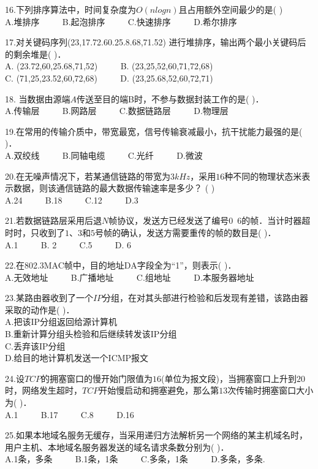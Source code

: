 16.下列排序算法中，时间复杂度为$O(nlogn)$且占用额外空间最少的是(    ) \\
A.堆排序 $\qquad$ B.起泡排序 $\qquad$ C.快速排序 $\qquad$ D.希尔排序

17.对关键码序列(23,17.72.60.25.8.68,71.52) 进行堆排序，输出两个最小关键码后的剩余堆是(    )． \\
A. (23.72,60,25.68,71,52) $\qquad$ B. (23,25,52,60,71,72,68) \\
C. (71,25,23.52,60,72,68) $\qquad$ D. (23,25.68,52,60,72,71)

18. 当数据由源端$A$传送至目的端B时，不参与数据封装工作的是(    )． \\
A.传输层 $\qquad$ B.网路层 $\qquad$ C.数据链路层 $\qquad$ D.物理层

19.在常用的传输介质中，带宽最宽，信号传输衰减最小，抗干扰能力最强的是(    )． \\
A.双绞线 $\qquad$ B.同轴电缆 $\qquad$ C.光纤 $\qquad$ D.微波

20.在无噪声情况下，若某通信链路的带宽为$3kHz$，采用$16$种不同的物理状态米表示数据，则该通信链路的最大数据传输速率是多少？ (    ) \\
A.24 $\qquad$ B.18 $\qquad$ C.12 $\qquad$ D.3

21.若数据链路层采用后退$N$帧协议，发送方已经发送了编号$0$~$6$的帧．当计时器超时时，只收到了$1$、$3$和$5$号帧的确认，发送方需要重传的帧的数目是(    )． \\
A.1 $\qquad$ B. 2 $\qquad$ C.5 $\qquad$ D. 6

22.在802.3MAC帧中，目的地址DA字段全为“1”，则表示(    )． \\
A.无效地址 $\qquad$ B.广播地址 $\qquad$ C.组地址 $\qquad$ D.本服务器地址

23.某路由器收到了一个$IP$分组，在对其头部进行检验和后发现有差错，该路由器采取的动作是(    )． \\
A.把该IP分组返回给源计算机 \\
B.重新计算分组头检验和后继续转发该IP分组 \\
C.丢弃该IP分组 \\
D.给目的地计算机发送一个ICMP报文

24.设$TCP$的拥塞窗口的慢开始门限值为$16$(单位为报文段)，当拥塞窗口上升到$20$时，网络发生超时，$TCP$开始慢启动和拥塞避免，那么第$13$次传输时拥塞窗口大小为(    )． \\
A.1 $\qquad$ B.17 $\qquad$ C.8 $\qquad$ D.16

25.如果本地域名服务无缓存，当采用递归方法解析另一个网络的某主机域名时，用户主机、本地域名服务器发送的域名请求条数分别为(    )． \\
A.1条，多条 $\qquad$ B.1条，1条 $\qquad$ C.多条，1条 $\qquad$ D.多条，多条.
